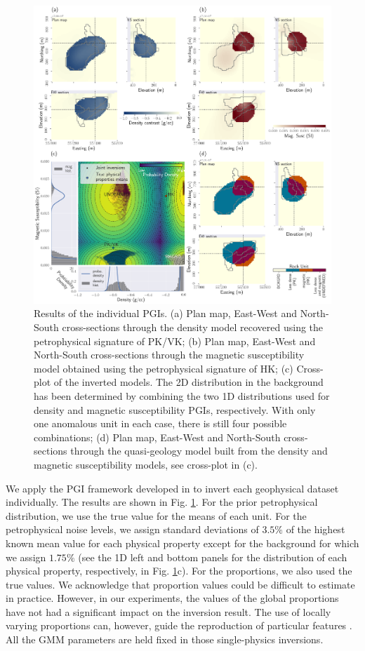\documentclass[extra, mreferee]{gji_joint} %
\begin{document}
\begin{figure}
\centering
\includegraphics[width=\textwidth]{Fig/LowRes/TKC_IndividualPetro_Synthetic.png}
\caption{Results of the individual PGIs. (a) Plan map, East-West and North-South cross-sections through the density model recovered using the petrophysical signature of PK/VK; (b) Plan map, East-West and North-South cross-sections through the magnetic susceptibility model obtained using the petrophysical signature of HK; (c) Cross-plot of the inverted models. The 2D distribution in the background has been determined by combining the two 1D distributions used for density and magnetic susceptibility PGIs, respectively. With only one anomalous unit in each case, there is still four possible combinations; (d) Plan map, East-West and North-South cross-sections through the quasi-geology model built from the density and magnetic susceptibility models, see cross-plot in (c).}
\label{fig:TKC_IndividualPetro_Synthetic.png}
\end{figure}

We apply the PGI framework developed in \citet{ggz389} to invert each geophysical dataset individually. The results are shown in Fig. \ref{fig:TKC_IndividualPetro_Synthetic.png}. For the prior petrophysical distribution, we use the true value for the means of each unit. For the petrophysical noise levels, we assign standard deviations of $3.5\%$ of the highest known mean value for each physical property except for the background for which we assign $1.75\%$ (see the 1D left and bottom panels for the distribution of each physical property, respectively, in Fig. \ref{fig:TKC_IndividualPetro_Synthetic.png}c). For the proportions, we also used the true values. We acknowledge that proportion values could be difficult to estimate in practice. However, in our experiments, the values of the global proportions have not had a significant impact on the inversion result. The use of locally varying proportions can, however, guide the reproduction of particular features \citep{Giraud2017, ggz389}. All the GMM parameters are held fixed in those single-physics inversions.
\end{document}
